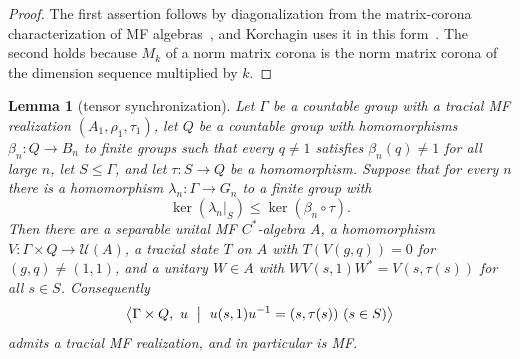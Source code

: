 \documentclass[11pt]{amsart}
\newtheorem{lemma}[theorem]{Lemma}
\theoremstyle{remark}
\theoremstyle{plain}
\newcommand{\U}{\mathcal U}
\begin{document}
\begin{proof}
The first assertion follows by diagonalization from the matrix-corona
characterization of MF algebras~\cite{BK}, and Korchagin uses it in this
form~\cite[Proposition~6]{Korchagin}.  The second holds because $M_k$ of
a norm matrix corona is the norm matrix corona of the dimension sequence
multiplied by $k$.
\end{proof}

\begin{lemma}[tensor synchronization]\label{lem:tensor-sync}
Let $\Gamma$ be a countable group with a tracial MF realization
$(A_1,\rho_1,\tau_1)$, let $Q$ be a countable group with homomorphisms
$\beta_n\colon Q\to B_n$ to finite groups such that every $q\ne1$
satisfies $\beta_n(q)\ne1$ for all large $n$, let $S\le\Gamma$, and let
$\tau\colon S\to Q$ be a homomorphism.  Suppose that for every $n$ there
is a homomorphism $\lambda_n\colon\Gamma\to G_n$ to a finite group with
\[
 \ker(\lambda_n|_S)\le\ker(\beta_n\circ\tau).
\]
Then there are a separable unital MF $C^*$-algebra $A$, a homomorphism
$V\colon\Gamma\times Q\to\U(A)$, a tracial state $T$ on $A$ with
$T(V(g,q))=0$ for $(g,q)\ne(1,1)$, and a unitary $W\in A$ with
$WV(s,1)W^*=V(s,\tau(s))$ for all $s\in S$.  Consequently
\[
 \bigl\langle\Gamma\times Q,\ u\ \bigm|\ u(s,1)u^{-1}=(s,\tau(s))\ (s\in S)\bigr\rangle
\]
admits a tracial MF realization, and in particular is MF\@.
\end{lemma}
\end{document}
